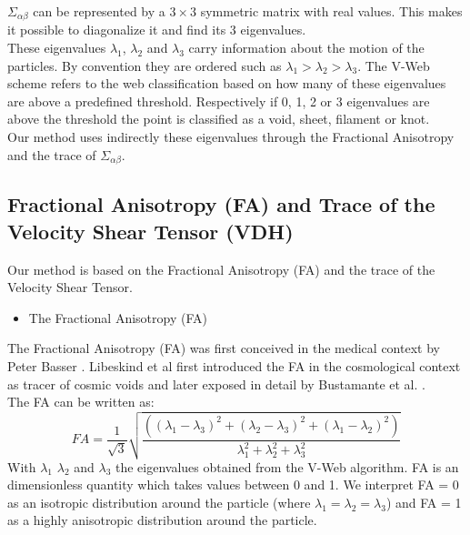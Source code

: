 \documentclass[12pt]{article}
\begin{document}
$\Sigma _{\alpha\beta}$ can be represented by a $3 \times
 3$ symmetric matrix with real values. This makes it
  possible to diagonalize it and find its 3 eigenvalues.\\
These eigenvalues $\lambda_1$, $\lambda_2$ and
 $\lambda_3$ carry information about the motion of the
 particles. By convention they are ordered such as
  $\lambda_1 > \lambda_2 >\lambda_3$. The V-Web scheme
   refers to the web classification based on how many of
    these eigenvalues are above a predefined threshold.
     Respectively if 0, 1, 2 or 3 eigenvalues are above
      the threshold the point is classified as a void,
       sheet, filament or knot. \\
       
Our method uses indirectly these eigenvalues through the
 Fractional Anisotropy and the trace of 
 $\Sigma _{\alpha\beta}$.


\subsection{Fractional Anisotropy (FA) and Trace of the Velocity Shear Tensor (VDH)}
\label{sec:FA_trace}

Our method is based on the Fractional Anisotropy (FA) and the trace of the Velocity Shear Tensor.\\

\begin{itemize}
\item The Fractional Anisotropy (FA)
\end{itemize}

The Fractional Anisotropy (FA) was first conceived in the
 medical context by Peter Basser
  \cite{basser_inferring_1995}. Libeskind et al
   \cite{libeskind_velocity_2013} first introduced the FA
    in the cosmological context as tracer of cosmic voids
     and later exposed in detail by Bustamante et al.
     \cite{bustamante_tensor_2015}.\\
    
The FA can be written as:
\[
FA = \frac{1}{\sqrt{3}} \sqrt{\frac{( \left( \lambda_1 - \lambda_3 \right)^2 + \left( \lambda_2 - \lambda_3 \right)^2 + \left( \lambda_1 - \lambda_2 \right)^2  )}{\lambda^{2}_1 + \lambda^{2}_2 + \lambda^{2}_3}} 
\]
With $\lambda_1$ $\lambda_2$ and $\lambda_3$ the
 eigenvalues obtained from the V-Web algorithm. FA is an
  dimensionless quantity which takes values between 0 and
   1. We
  interpret FA = 0 as an isotropic distribution around
   the particle (where $\lambda_1 = \lambda_2 =
    \lambda_3$) and FA = 1 as a highly anisotropic
     distribution around the particle.
\end{document}
